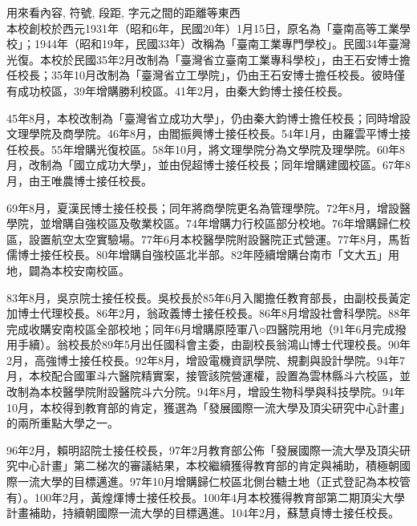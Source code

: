 
\UseChiLinesSpacing


\newpage
{}
用來看內容, 符號, 段距, 字元之間的距離等東西\\

本校創校於西元1931年（昭和6年，民國20年）1月15日，原名為「臺南高等工業學校」；1944年（昭和19年，民國33年）改稱為「臺南工業專門學校」。民國34年臺灣光復。本校於民國35年2月改制為「臺灣省立臺南工業專科學校」，由王石安博士擔任校長；35年10月改制為「臺灣省立工學院」，仍由王石安博士擔任校長。彼時僅有成功校區，39年增購勝利校區。41年2月，由秦大鈞博士接任校長。

45年8月，本校改制為「臺灣省立成功大學」，仍由秦大鈞博士擔任校長；同時增設文理學院及商學院。46年8月，由閻振興博士接任校長。54年1月，由羅雲平博士接任校長。55年增購光復校區。58年10月，將文理學院分為文學院及理學院。60年8月，改制為「國立成功大學」，並由倪超博士接任校長；同年增購建國校區。67年8月，由王唯農博士接任校長。

69年8月，夏漢民博士接任校長；同年將商學院更名為管理學院。72年8月，增設醫學院，並增購自強校區及敬業校區。74年增購力行校區部分校地。76年增購歸仁校區，設置航空太空實驗場。77年6月本校醫學院附設醫院正式營運。77年8月，馬哲儒博士接任校長。80年增購自強校區北半部。82年陸續增購台南市「文大五」用地，闢為本校安南校區。

83年8月，吳京院士接任校長。吳校長於85年6月入閣擔任教育部長，由副校長黃定加博士代理校長。86年2月，翁政義博士接任校長。86年8月增設社會科學院。88年完成收購安南校區全部校地；同年6月增購原陸軍八○四醫院用地（91年6月完成撥用手續）。翁校長於89年5月出任國科會主委，由副校長翁鴻山博士代理校長。90年2月，高強博士接任校長。92年8月，增設電機資訊學院、規劃與設計學院。94年7月，本校配合國軍斗六醫院精實案，接管該院營運權，設置為雲林縣斗六校區，並改制為本校醫學院附設醫院斗六分院。94年8月，增設生物科學與科技學院。94年10月，本校得到教育部的肯定，獲選為「發展國際一流大學及頂尖研究中心計畫」的兩所重點大學之一。

96年2月，賴明詔院士接任校長，97年2月教育部公佈「發展國際一流大學及頂尖研究中心計畫」第二梯次的審議結果，本校繼續獲得教育部的肯定與補助，積極朝國際一流大學的目標邁進。97年10月增購歸仁校區北側台糖土地（正式登記為本校管有）。100年2月，黃煌煇博士接任校長。100年4月本校獲得教育部第二期頂尖大學計畫補助，持續朝國際一流大學的目標邁進。104年2月，蘇慧貞博士接任校長。


